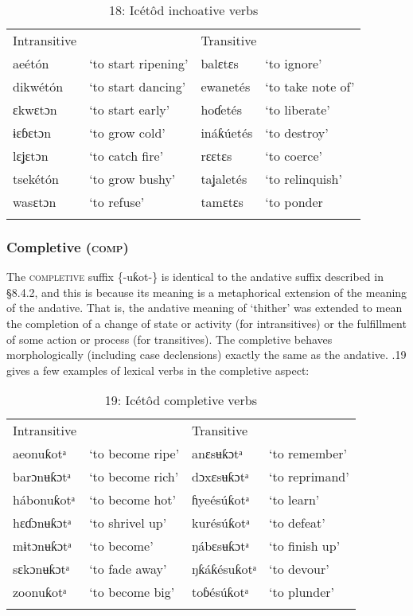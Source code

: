 \begin{table}
\caption{18: Icétôd inchoative verbs}
\label{tab:8}


\begin{tabularx}{\textwidth}{XXXX}
\lsptoprule

Intransitive &  & \multicolumn{2}{X}{Transitive}\\
aeétón & ‘to start ripening’ & balɛtɛs & ‘to ignore’\\
dikwétón & ‘to start dancing’ & ewanetés & ‘to take note of’\\
ɛkwɛtɔn & ‘to start early’ & hoɗetés & ‘to liberate’\\
ɨɛɓɛtɔn & ‘to grow cold’ & ináƙúetés & ‘to destroy’\\
lɛʝɛtɔn & ‘to catch fire’ & rɛɛtɛs & ‘to coerce’\\
tsekétón & ‘to grow bushy’ & taʝaletés & ‘to relinquish’\\
wasɛtɔn & ‘to refuse’ & tamɛtɛs & ‘to ponder\\
\lspbottomrule
\end{tabularx}
\end{table}

\subsubsection{Completive (\textsc{comp})}

The \textsc{completive} suffix \{-uƙot-\} is identical to the andative suffix described in §8.4.2, and this is because its meaning is a metaphorical extension of the meaning of the andative. That is, the andative meaning of ‘thither’ was extended to mean the completion of a change of state or activity (for intransitives) or the fulfillment of some action or process (for transitives). The completive behaves morphologically (including case declensions) exactly the same as the andative. .19 gives a few examples of lexical verbs in the completive aspect:


\begin{table}
\caption{19: Icétôd completive verbs}
\label{tab:8}


\begin{tabularx}{\textwidth}{XXXX}
\lsptoprule

Intransitive &  & \multicolumn{2}{X}{Transitive}\\
aeonuƙotᵃ & ‘to become ripe’ & anɛsʉƙɔtᵃ & ‘to remember’\\
barɔnʉƙɔtᵃ & ‘to become rich’ & dɔxɛsʉƙɔtᵃ & ‘to reprimand’\\
hábonuƙotᵃ & ‘to become hot’ & ɦyeésúƙotᵃ & ‘to learn’\\
hɛɗɔnʉƙɔtᵃ & ‘to shrivel up’ & kurésúƙotᵃ & ‘to defeat’\\
mɨtɔnʉƙɔtᵃ & ‘to become’ & ŋábɛsʉƙɔtᵃ & ‘to finish up’\\
sɛkɔnʉƙɔtᵃ & ‘to fade away’ & ŋƙáƙésuƙotᵃ & ‘to devour’\\
zoonuƙotᵃ & ‘to become big’ & toɓésúƙotᵃ & ‘to plunder’\\
\lspbottomrule
\end{tabularx}
\end{table}

